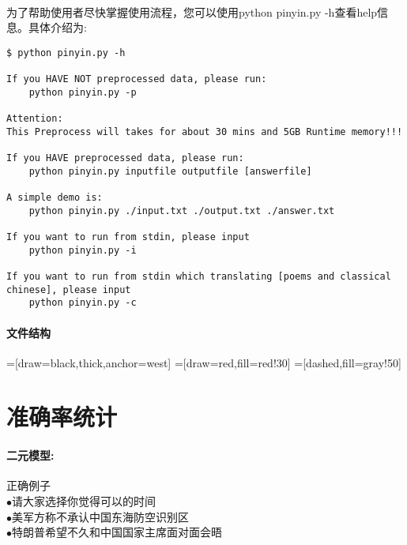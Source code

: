 \documentclass[UTF8, onecolumn, a4paper]{article}
\begin{document}
\paragraph*{}
为了帮助使用者尽快掌握使用流程，您可以使用python pinyin.py -h查看help信息。具体介绍为:
\begin{lstlisting}[language={}, title={help}] 
$ python pinyin.py -h

If you HAVE NOT preprocessed data, please run:
	python pinyin.py -p

Attention:
This Preprocess will takes for about 30 mins and 5GB Runtime memory!!!

If you HAVE preprocessed data, please run:
	python pinyin.py inputfile outputfile [answerfile]

A simple demo is:
	python pinyin.py ./input.txt ./output.txt ./answer.txt

If you want to run from stdin, please input
	python pinyin.py -i

If you want to run from stdin which translating [poems and classical chinese], please input
	python pinyin.py -c
\end{lstlisting}
\paragraph{文件结构}
=[draw=black,thick,anchor=west]
=[draw=red,fill=red!30]
=[dashed,fill=gray!50]
\begin{center}
\end{center}


\section{准确率统计}
\paragraph{二元模型: }正确例子\\
$\bullet$请大家选择你觉得可以的时间\\
$\bullet$美军方称不承认中国东海防空识别区\\
$\bullet$特朗普希望不久和中国国家主席面对面会晤
\end{document}
